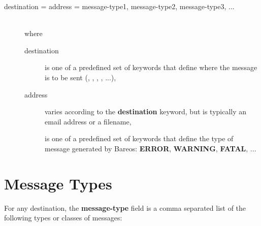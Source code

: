 \begin{description}

\item [destination = address = message-type1, message-type2, message-type3, ...] \hfill \\

where

\begin{description}
    \item [destination] is one of a predefined set of keywords that define
where the message is to be sent (, , , , ...), 
    \item [address] varies according to the {\bf destination} keyword, but
is typically an email address or a filename,
    \item [] is one of a predefined set of keywords that define the type of
message generated by Bareos: {\bf ERROR}, {\bf WARNING}, {\bf FATAL},
...
\end{description}

\end{description}





\section{Message Types}
\label{MessageTypes}

For any destination, the {\bf message-type} field is a comma separated
list of the following types or classes of messages:


